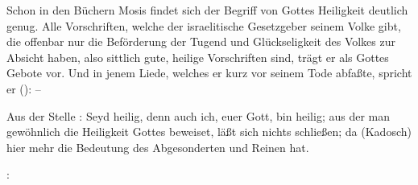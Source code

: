 \begin{aufza}
\item Schon in den Büchern Mosis findet sich der Begriff von Gottes Heiligkeit deutlich genug. Alle Vorschriften, welche der israelitische Gesetzgeber seinem Volke gibt, die offenbar nur die Beförderung der Tugend und Glückseligkeit des Volkes zur Absicht haben, also sittlich gute, heilige Vorschriften sind, trägt er als Gottes Gebote vor. Und in jenem Liede, welches er kurz vor seinem Tode abfaßte, spricht er ():  -- \uam\ 

\begin{RWanm} Aus der Stelle : Seyd heilig, denn auch ich, euer Gott, bin heilig; aus der man gewöhnlich die Heiligkeit Gottes beweiset, läßt sich nichts schließen; da  (Kadosch) hier mehr die Bedeutung des Abgesonderten und Reinen hat.
\end{RWanm}

\item {}:\par
{}\par


\end{aufza}
